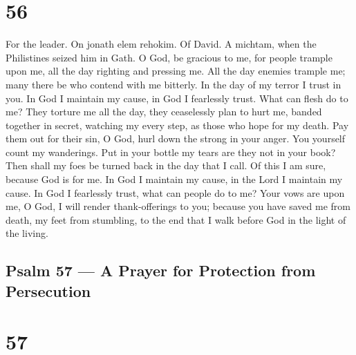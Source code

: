 \hypertarget{section-55}{%
\section{56}\label{section-55}}

For the leader. On jonath elem rehokim. Of David. A michtam, when the
Philistines seized him in Gath.  O God, be gracious to me,
for people trample upon me, all the day righting and pressing me.
 All the day enemies trample me; many there be who contend
with me bitterly.  In the day of my terror I trust in you.
 In God I maintain my cause, in God I fearlessly trust. What
can flesh do to me?  They torture me all the day, they
ceaselessly plan to hurt me,  banded together in secret,
watching my every step, as those who hope for my death.  Pay
them out for their sin, O God, hurl down the strong in your anger.
 You yourself count my wanderings. Put in your bottle my
tears are they not in your book?  Then shall my foes be
turned back in the day that I call. Of this I am sure, because God is
for me.  In God I maintain my cause, in the Lord I maintain
my cause.  In God I fearlessly trust, what can people do to
me?  Your vows are upon me, O God, I will render
thank-offerings to you;  because you have saved me from
death, my feet from stumbling, to the end that I walk before God in the
light of the living.

\hypertarget{psalm-57-a-prayer-for-protection-from-persecution}{%
\subsection{Psalm 57 --- A Prayer for Protection from
Persecution}\label{psalm-57-a-prayer-for-protection-from-persecution}}

\hypertarget{section-56}{%
\section{57}\label{section-56}}

